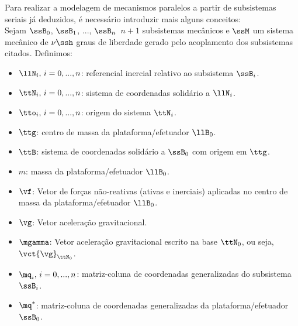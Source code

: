 \documentclass[]{politex}
\begin{document}
Para realizar a modelagem de mecanismos paralelos a partir de subsistemas seriais j\'a deduzidos, \'e necess\'ario introduzir mais alguns conceitos: \\

Sejam $\ssB_0$, $\ssB_1$, ..., $\ssB_{n} \,$ $n+1$ subsistemas mec\^anicos e $\ssM$ um sistema mec\^anico de $\nu\ssh$ graus de liberdade gerado pelo acoplamento dos subsistemas citados. Definimos:

\begin{itemize}
\item $\llN_i, \, i=0,...,n$: referencial inercial relativo ao subsistema $\ssB_i$.
\item $\ttN_i, \, i=0,...,n$: sistema de coordenadas solidário a $\llN_i$.
\item $\tto_i, \,i=0,...,n$: origem do sistema $\ttN_i$.
\item $\ttg$: centro de massa da plataforma/efetuador $\llB_0$.
\item $\ttB$: sistema de coordenadas solidário a $\ssB_0$ com origem em $\ttg$.
\item $m$: massa da plataforma/efetuador $\llB_0$.
\item $\vf$: Vetor de forças não-reativas (ativas e inerciais) aplicadas no centro de massa da plataforma/efetuador $\llB_0$.
\item $\vg$: Vetor aceleração gravitacional.
\item $\mgamma$: Vetor aceleração gravitacional escrito na base $\ttN_0$, ou seja, $\vct{\vg}_{\ttN_0}$.
\item $\mq_i, \,i=0, ..., n$: matriz-coluna de coordenadas generalizadas do subsistema $\ssB_i$.
\item $\mq^\ast$: matriz-coluna de coordenadas generalizadas da plataforma/efetuador $\ssB_0$. %

\end{itemize}
\end{document}

